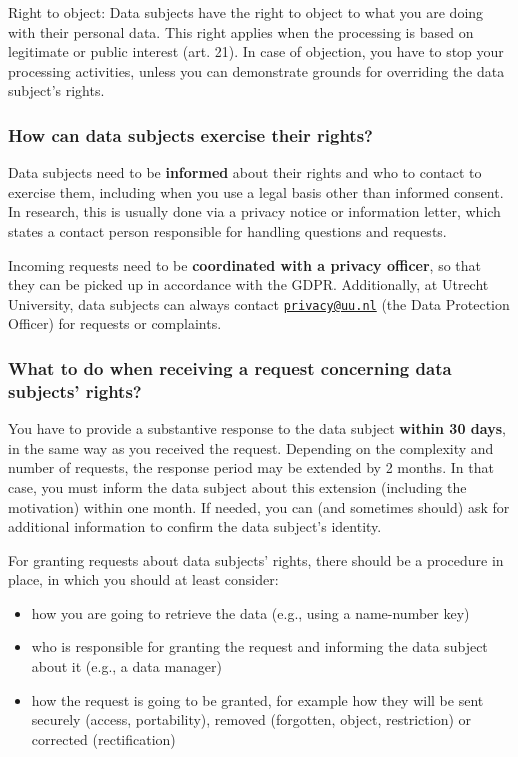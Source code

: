 \documentclass[
]{book}
\providecommand{\tightlist}{%
  \setlength{\itemsep}{0pt}\setlength{\parskip}{0pt}}
\begin{document}
Right to object:
Data subjects have the right to object to what you are doing with their personal data. This right applies
when the processing is based on legitimate or public interest
(art. 21). In case of objection, you have to
stop your processing activities, unless you can demonstrate grounds for overriding the data subject's rights.

\hypertarget{how-can-data-subjects-exercise-their-rights}{%
\subsubsection{How can data subjects exercise their rights?}\label{how-can-data-subjects-exercise-their-rights}}

Data subjects need to be \textbf{informed} about their rights and who to contact to exercise them, including
when you use a legal basis other than informed consent. In research, this is usually done via a
privacy notice or information letter, which states a contact person
responsible for handling questions and requests.

Incoming requests need to be \textbf{coordinated with a privacy officer}, so that they can be picked
up in accordance with the GDPR. Additionally, at Utrecht University, data subjects can always
contact \href{mailto:privacy@uu.nl}{\nolinkurl{privacy@uu.nl}} (the Data Protection Officer) for requests or complaints.

\hypertarget{what-to-do-when-receiving-a-request-concerning-data-subjects-rights}{%
\subsubsection{What to do when receiving a request concerning data subjects' rights?}\label{what-to-do-when-receiving-a-request-concerning-data-subjects-rights}}

You have to provide a substantive response to the data subject \textbf{within 30 days}, in the same way as you
received the request. Depending on the complexity and number of requests, the response period may be
extended by 2 months. In that case, you must inform the data subject about this extension (including the
motivation) within one month. If needed, you can (and sometimes should) ask for additional information
to confirm the data subject's identity.

For granting requests about data subjects' rights, there should be a procedure in place, in which you
should at least consider:

\begin{itemize}
\tightlist
\item
  how you are going to retrieve the data (e.g., using a name-number key)
\item
  who is responsible for granting the request and informing the data subject about it (e.g., a data manager)
\item
  how the request is going to be granted, for example how they will be sent securely (access, portability), removed (forgotten, object, restriction) or corrected (rectification)
\end{itemize}
\end{document}
